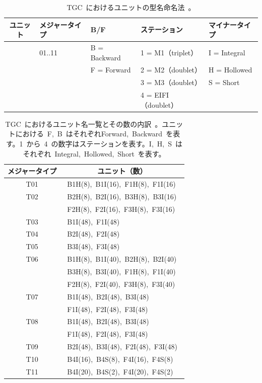 \begin{table}[tb]
	\centering
	\begin{tabular}{c|llll}\hline
		 ユニット & メジャータイプ & B/F & ステーション & マイナータイプ \\ \hline
		 &01..11& B = Backward & 1 = M1（triplet）& I = Integral \\
		 && F = Forward  & 2 = M2（doublet）& H = Hollowed \\
		 &&              & 3 = M3（doublet）& S = Short    \\
		 &&              & 4 = EIFI（doublet）& \\
	\end{tabular}
	\caption[TGC~におけるユニットの型名命名法]{TGC~におけるユニットの型名命名法~\cite{TR:02}。}
	\label{tb:unit1}
\end{table}

\begin{table}[tb]
	\centering
	\begin{tabular}{c|l}\hline
		 メジャータイプ & \multicolumn{1}{c}{ユニット（数）}\\ \hline
		~T01~&~B1H(8),~B1I(16),~F1H(8),~F1I(16)~\\
		~T02~&~B2H(8),~B2I(16),~B3H(8),~B3I(16)~\\
		     &~F2H(8),~F2I(16),~F3H(8),~F3I(16)~\\
		~T03~&~B1I(48),~F1I(48)~\\
        ~T04~&~B2I(48),~F2I(48)~\\
		~T05~&~B3I(48),~F3I(48)~\\
		~T06~&~B1H(8),~B1I(40),~B2H(8),~B2I(40)~\\
		     &~B3H(8),~B3I(40),~F1H(8),~F1I(40)~\\       
		     &~F2H(8),~F2I(40),~F3H(8),~F3I(40)~\\
		~T07~&~B1I(48),~B2I(48),~B3I(48)~\\
		     &~F1I(48),~F2I(48),~F3I(48)~\\
		~T08~&~B1I(48),~B2I(48),~B3I(48)~\\
		     &~F1I(48),~F2I(48),~F3I(48)~\\
		~T09~&~B2I(48),~B3I(48),~F2I(48),~F3I(48)~\\
		~T10~&~B4I(16),~B4S(8),~F4I(16),~F4S(8)~\\
		~T11~&~B4I(20),~B4S(2),~F4I(20),~F4S(2)~\\
	\end{tabular}
	\caption[TGC~におけるユニット名一覧とその数の内訳]{TGC~におけるユニット名一覧とその数の内訳~\cite{TR:02}。ユニットにおける~F,~B~はそれぞれForward,~Backward~を表す。1~から~4~の数字はステーションを表す。I,~H,~S~はそれぞれ~Integral,~Hollowed,~Short~を表す。}
    \label{tb:unit2}
\end{table}

